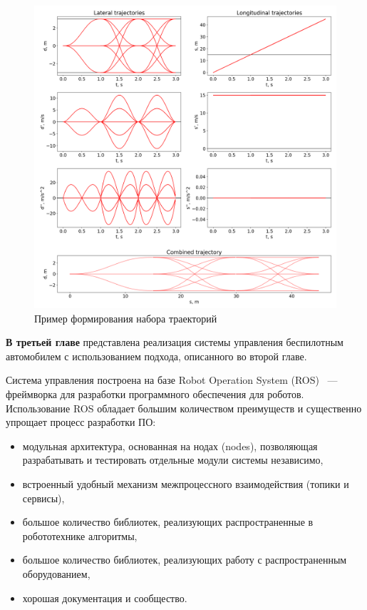 \begin{figure}[h]
    \centering
    \includegraphics[width=\linewidth]{images/2_project/quintic_2/multistep_trajectories}
          \caption{Пример формирования набора траекторий}
    \label{img:multistep_trajectories}
\end{figure}

\textbf{В третьей главе} представлена реализация системы управления беспилотным автомобилем с
использованием подхода, описанного во второй главе.

Система управления построена на базе Robot Operation System (ROS) ~--- фреймворка для разработки
программного обеспечения для роботов. Использование ROS обладает большим количеством преимуществ
и существенно упрощает процесс разработки ПО:
\begin{itemize}
    \item модульная архитектура, основанная на нодах (nodes), позволяющая разрабатывать
          и тестировать отдельные модули системы независимо,
    \item встроенный удобный механизм межпроцессного взаимодействия (топики и сервисы),
    \item большое количество библиотек, реализующих распространенные в робототехнике алгоритмы,
    \item большое количество библиотек, реализующих работу с распространенным оборудованием,
    \item хорошая документация и сообщество.
\end{itemize}

